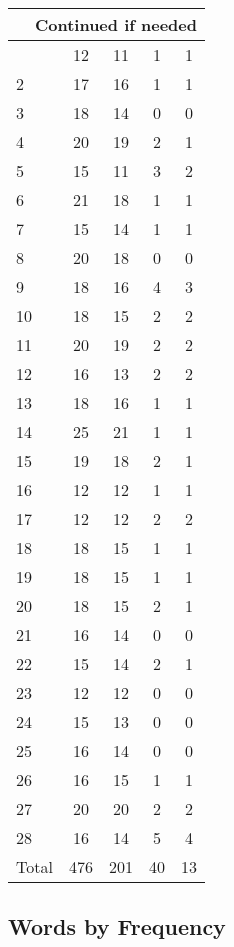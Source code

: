 \begin{center}
\begin{longtable}{l|c|c|c|c}
\hline \multicolumn{5}{|r|}{{Continued if needed}} \\ \hline
\endfoot 
1 & 12 & 11 & 1 & 1\\ \hline
2 & 17 & 16 & 1 & 1\\ \hline
3 & 18 & 14 & 0 & 0\\ \hline
4 & 20 & 19 & 2 & 1\\ \hline
5 & 15 & 11 & 3 & 2\\ \hline
6 & 21 & 18 & 1 & 1\\ \hline
7 & 15 & 14 & 1 & 1\\ \hline
8 & 20 & 18 & 0 & 0\\ \hline
9 & 18 & 16 & 4 & 3\\ \hline
10 & 18 & 15 & 2 & 2\\ \hline
11 & 20 & 19 & 2 & 2\\ \hline
12 & 16 & 13 & 2 & 2\\ \hline
13 & 18 & 16 & 1 & 1\\ \hline
14 & 25 & 21 & 1 & 1\\ \hline
15 & 19 & 18 & 2 & 1\\ \hline
16 & 12 & 12 & 1 & 1\\ \hline
17 & 12 & 12 & 2 & 2\\ \hline
18 & 18 & 15 & 1 & 1\\ \hline
19 & 18 & 15 & 1 & 1\\ \hline
20 & 18 & 15 & 2 & 1\\ \hline
21 & 16 & 14 & 0 & 0\\ \hline
22 & 15 & 14 & 2 & 1\\ \hline
23 & 12 & 12 & 0 & 0\\ \hline
24 & 15 & 13 & 0 & 0\\ \hline
25 & 16 & 14 & 0 & 0\\ \hline
26 & 16 & 15 & 1 & 1\\ \hline
27 & 20 & 20 & 2 & 2\\ \hline
28 & 16 & 14 & 5 & 4\\ \hline
\hline \hline
Total & 476 & 201 & 40 & 13




\end{longtable}
\end{center}



\subsection{Words by Frequency}

